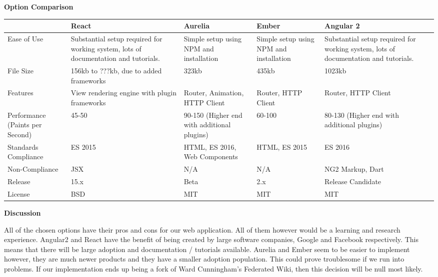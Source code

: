 \documentclass[letterpaper, 10pt, draftclsnofoot, compsoc, onecolumn]{IEEEtran}
\begin{document}
{{ \par}


\newpage
{\noindent\rmfamily\bfseries\color{black} Option Comparison \par}
\vspace{1pc}
\tablehead{}
\begin{supertabular}{|p{2cm}|p{2.5cm}|p{2.5cm}|p{2.5cm}|p{2.5cm}|}
\hline \cite{Eisenberg} & React & Aurelia  & Ember  & Angular 2 \\ \hline
Ease of Use & Substantial setup required for working system, lots of documentation and tutorials. & Simple setup using NPM and installation     & Simple setup using NPM and installation & Substantial setup required for working system, lots of documentation and tutorials. \\ \hline
File Size & 156kb to ???kb, due to added frameworks & 323kb & 435kb                                   & 1023kb \\ \hline
Features & View rendering engine with plugin frameworks & Router, Animation, HTTP Client & Router, HTTP Client & Router, HTTP Client                                                                 \\ \hline
Performance (Paints per Second) & 45-50 & 90-150 (Higher end with additional plugins) & 60-100 & 80-130 (Higher end with additional plugins) \\ \hline
Standards Compliance & ES 2015 & HTML, ES 2016, Web Components & HTML, ES 2015                           & ES 2016\\ \hline
Non-Compliance & JSX                                                                                 & N/A & N/A & NG2 Markup, Dart \\ \hline
Release & 15.x & Beta & 2.x  & Release Candidate \\ \hline
License & BSD & MIT & MIT & MIT \\ \hline
\end{supertabular}

\newpage
{\noindent\rmfamily\bfseries\color{black} Discussion \par}
{\noindent All of the chosen options have their pros and cons for our web application. All of them however would be a learning and research experience. Angular2 and React have the benefit of being created by large software companies, Google and Facebook respectively. This means that there will be large adoption and documentation / tutorials available. Aurelia and Ember seem to be easier to implement however, they are much newer products and they have a smaller adoption population. This could prove troublesome if we run into problems. If our implementation ends up being a fork of Ward Cunningham's Federated Wiki, then this decision will be null most likely. \par}

}
\end{document}
